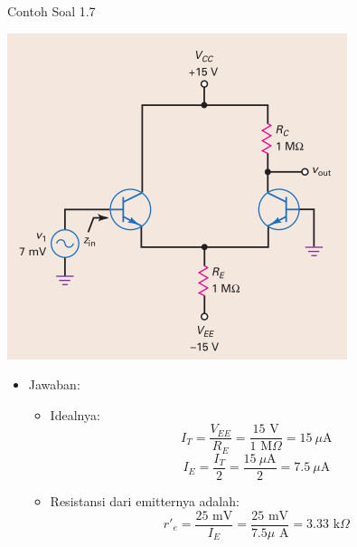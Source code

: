 \documentclass[aspectratio=169]{beamer}
\begin{document}
\begin{frame}{Contoh Soal 1.7}
	\begin{multicols}{2}
		\begin{center}
			\includegraphics[height=0.7\textheight]{gambar/01.contoh_soal_07}
		\end{center}
		\columnbreak
		\begin{itemize}
			\item Jawaban:
			\begin{itemize}
				\item Idealnya:
				\[ I_T = \frac{V_{EE}}{R_E} = \frac{15 \text{ V}}{1 \text{ M}\Omega} = 15~\mu\text{A} \]
				\[ I_E = \frac{I_T}{2} = \frac{15~\mu\text{A}}{2} = 7.5~\mu\text{A}\]
				\item Resistansi dari emitternya adalah:
				\[ r'_e = \frac{25 \text{ mV}}{ I_E} =\frac{25 \text{ mV}}{7.5 \mu\text{ A}} = 3.33 \text{ k}\Omega \]
			\end{itemize}
		\end{itemize}
	\end{multicols}
\end{frame}
\end{document}
